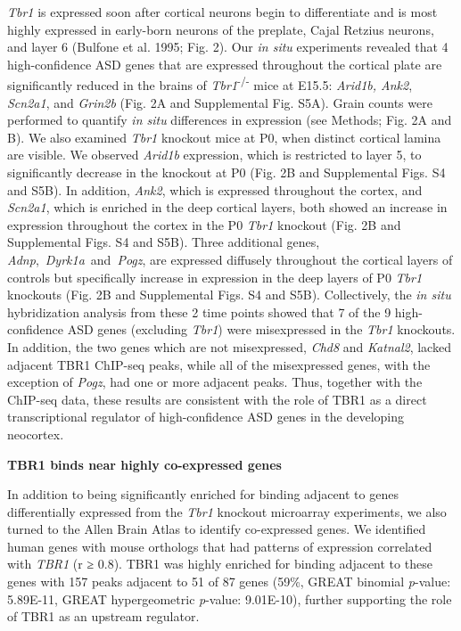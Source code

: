 \documentclass[]{article}
\begin{document}
\emph{Tbr1} is expressed soon after cortical neurons begin to
differentiate and is most highly expressed in early-born neurons of the
preplate, Cajal Retzius neurons, and layer 6 (Bulfone et al. 1995; Fig.
2). Our \emph{in situ} experiments revealed that 4 high-confidence ASD
genes that are expressed throughout the cortical plate are significantly
reduced in the brains of \emph{Tbr1}\textsuperscript{-/-} mice at E15.5:
\emph{Arid1b, Ank2}, \emph{Scn2a1}, and \emph{Grin2b} (Fig. 2A and
Supplemental Fig. S5A). Grain counts were performed to quantify \emph{in
situ} differences in expression (see Methods; Fig. 2A and B). We also
examined \emph{Tbr1} knockout mice at P0, when distinct cortical lamina
are visible. We observed \emph{Arid1b} expression, which is restricted
to layer 5, to significantly decrease in the knockout at P0 (Fig. 2B and
Supplemental Figs. S4 and S5B). In addition, \emph{Ank2}, which is
expressed throughout the cortex, and \emph{Scn2a1}, which is enriched in
the deep cortical layers, both showed an increase in expression
throughout the cortex in the P0 \emph{Tbr1} knockout (Fig. 2B and
Supplemental Figs. S4 and S5B). Three additional genes,
\emph{Adnp},~\emph{Dyrk1a}~and~\emph{Pogz}, are expressed diffusely
throughout the cortical layers of controls but specifically increase in
expression in the deep layers of P0 \emph{Tbr1} knockouts (Fig. 2B and
Supplemental Figs. S4 and S5B). Collectively, the \emph{in situ}
hybridization analysis from these 2 time points showed that 7 of the 9
high-confidence ASD genes (excluding \emph{Tbr1}) were misexpressed in
the \emph{Tbr1} knockouts. In addition, the two genes which are not
misexpressed, \emph{Chd8} and \emph{Katnal2}, lacked adjacent TBR1
ChIP-seq peaks, while all of the misexpressed genes, with the exception
of \emph{Pogz}, had one or more adjacent peaks. Thus, together with the
ChIP-seq data, these results are consistent with the role of TBR1 as a
direct transcriptional regulator of high-confidence ASD genes in the
developing neocortex.

\textbf{TBR1 binds near highly co-expressed genes}

In addition to being significantly enriched for binding adjacent to
genes differentially expressed from the \emph{Tbr1} knockout microarray
experiments, we also turned to the Allen Brain Atlas to identify
co-expressed genes. We identified human genes with mouse orthologs that
had patterns of expression correlated with \emph{TBR1} (r ≥ 0.8). TBR1
was highly enriched for binding adjacent to these genes with 157 peaks
adjacent to 51 of 87 genes (59\%, GREAT binomial \emph{p}-value:
5.89E-11, GREAT hypergeometric \emph{p}-value: 9.01E-10), further
supporting the role of TBR1 as an upstream regulator.
\end{document}
